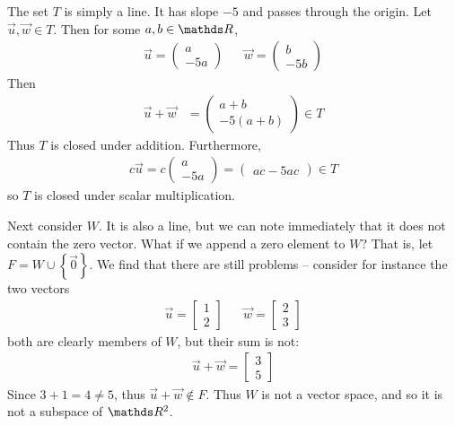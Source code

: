 \documentclass[11pt]{article}
\newcommand{\vek}[1]{\vec{#1}}
\begin{document}
The set $T$ is simply a line. It has slope $-5$ and passes through the origin.
Let $\vek{u}, \vek{w} \in T$. Then for some $a,b \in \bbR$,
\begin{align*}
\vek{u} = \begin{pmatrix}a \\ -5a\end{pmatrix}
&&
\vek{w} = \begin{pmatrix}b \\ -5b\end{pmatrix}
\end{align*}
Then
\begin{align*}
\vek{u} + \vek{w} &= \begin{pmatrix}a+b \\ -5(a+b)\end{pmatrix} \in T
\end{align*}
Thus $T$ is closed under addition. Furthermore,
\begin{align*}
c \vek{u} = c \begin{pmatrix}a \\ -5a\end{pmatrix} = \begin{pmatrix}ac -5ac\end{pmatrix} \in T
\end{align*}
so $T$ is closed under scalar multiplication.

\vspace{.5cm}

Next consider $W$. It is also a line, but we can note immediately that it does not contain the zero vector. What if we append a zero element to $W$? That is, let $F = W \cup \left\{ \vek{0} \right\}$. We find that there are still problems -- consider for instance the two vectors
\begin{align*}
\vek{u} = \begin{bmatrix}1 \\ 2\end{bmatrix}
&&
\vek{w} = \begin{bmatrix}2 \\ 3\end{bmatrix}
\end{align*}
both are clearly members of $W$, but their sum is not:
\begin{align*}
\vek{u} + \vek{w} = \begin{bmatrix}3 \\ 5\end{bmatrix}
\end{align*}
Since $3+1 = 4 \neq 5$, thus $\vek{u} + \vek{w} \notin F$. Thus $W$ is not a vector space, and so it is not a subspace of $\bbR^2$.
\end{document}
